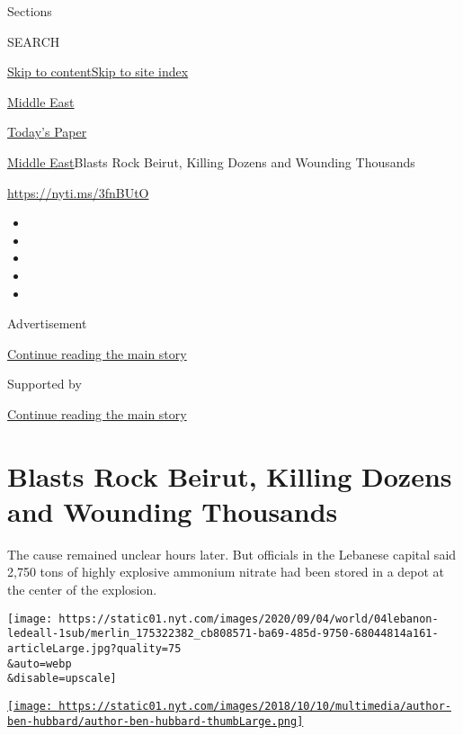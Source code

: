Sections

SEARCH

\protect\hyperlink{site-content}{Skip to
content}\protect\hyperlink{site-index}{Skip to site index}

\href{https://www.nytimes.com/section/world/middleeast}{Middle East}

\href{https://myaccount.nytimes.com/auth/login?response_type=cookie\&client_id=vi}{}

\href{https://www.nytimes.com/section/todayspaper}{Today's Paper}

\href{/section/world/middleeast}{Middle East}\textbar{}Blasts Rock
Beirut, Killing Dozens and Wounding Thousands

\url{https://nyti.ms/3fnBUtO}

\begin{itemize}
\item
\item
\item
\item
\item
\end{itemize}

Advertisement

\protect\hyperlink{after-top}{Continue reading the main story}

Supported by

\protect\hyperlink{after-sponsor}{Continue reading the main story}

\hypertarget{blasts-rock-beirut-killing-dozens-and-wounding-thousands}{%
\section{Blasts Rock Beirut, Killing Dozens and Wounding
Thousands}\label{blasts-rock-beirut-killing-dozens-and-wounding-thousands}}

The cause remained unclear hours later. But officials in the Lebanese
capital said 2,750 tons of highly explosive ammonium nitrate had been
stored in a depot at the center of the explosion.

\texttt{[image: https://static01.nyt.com/images/2020/09/04/world/04lebanon-ledeall-1sub/merlin\_175322382\_cb808571-ba69-485d-9750-68044814a161-articleLarge.jpg?quality=75\\\&auto=webp\\\&disable=upscale]}

\href{https://www.nytimes.com/by/ben-hubbard}{\texttt{[image: https://static01.nyt.com/images/2018/10/10/multimedia/author-ben-hubbard/author-ben-hubbard-thumbLarge.png]}}

